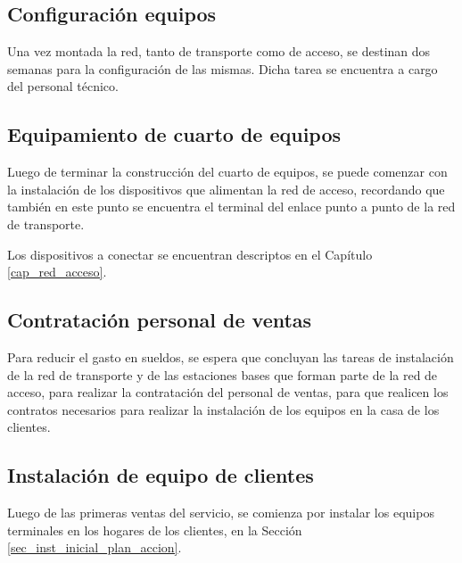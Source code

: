 \documentclass[12pt,a4paper]{book}
\begin{document}
\subsection{Configuración equipos}
Una vez montada la red, tanto de transporte como de acceso, se destinan dos semanas para la configuración de las mismas. Dicha tarea se encuentra a cargo del personal técnico.

\subsection{Equipamiento de cuarto de equipos}
Luego de terminar la construcción del cuarto de equipos, se puede comenzar con la instalación de los dispositivos que alimentan la red de acceso, recordando que también en este punto se encuentra el terminal del enlace punto a punto de la red de transporte. 

Los dispositivos a conectar se encuentran descriptos en el Capítulo \ref{cap_red_acceso}.


\subsection{Contratación personal de ventas}
Para reducir el gasto en sueldos, se espera que concluyan las tareas de instalación de la red de transporte y de las estaciones bases que forman parte de la red de acceso, para realizar la contratación del personal de ventas, para que realicen los contratos necesarios para realizar la instalación de los equipos en la casa de los clientes.

\subsection{Instalación de equipo de clientes}
Luego de las primeras ventas del servicio, se comienza por instalar los equipos terminales en los hogares de los clientes, en la Sección \ref{sec_inst_inicial_plan_accion}.
\end{document}
